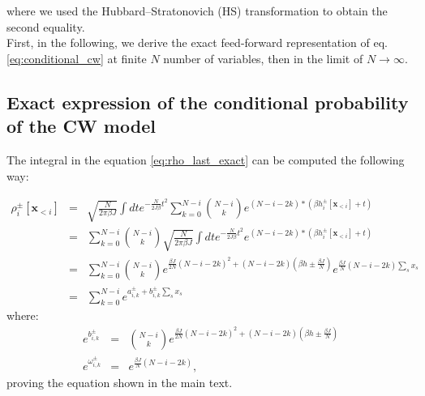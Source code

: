 \documentclass[10pt, notitlepage]{revtex4-2}
\begin{document}
 where we used the Hubbard–Stratonovich (HS) transformation to obtain the second equality.\\
 First, in the following, we derive the exact feed-forward representation of eq.\ref{eq:conditional_cw} at finite $N$ number of variables, then in the limit of $N\rightarrow \infty$.\\

 \subsection{Exact expression of the conditional probability of the CW model}
 The integral in the equation \ref{eq:rho_last_exact} can be computed the following way:

 \begin{eqnarray*}
 \rho_i^{\pm}[\mathbf{x}_{<i}] &=& \sqrt{\frac{N}{2\pi \beta J}}\int dt e^{-\frac{N}{2J \beta}t^{2}} 
 \sum_{k=0}^{N-i} \binom{N-i}{k} e^{(N-i-2k)*(\beta h_i^{\pm}[\mathbf{x}_{<i}] + t)}\\
 &=& \sum_{k=0}^{N-i} \binom{N-i}{k} \sqrt{\frac{N}{2\pi \beta J}}\int dt e^{-\frac{N}{2J \beta}t^{2}} 
  e^{(N-i-2k)*(\beta h_i^{\pm}[\mathbf{x}_{<i}] + t)}\\
&=& \sum_{k=0}^{N-i} \binom{N-i}{k}e^{\frac{\beta J}{2N}\left(N-i-2k\right)^{2}+\left(N-i-2k\right)\left(\beta h \pm \frac{\beta J}{N}\right)} e^{\frac{\beta J}{N}\left(N-i-2k\right) \sum_s x_s} \\
&=& \sum_{k=0}^{N-i} e^{a_{i,k}^{\pm} + b_{i,k}^{\pm} \sum_s x_s} 
\end{eqnarray*}
where:
\begin{eqnarray}
\label{eq:params}
e^{b_{i,k}^{\pm}} & = & \binom{N-i}{k}e^{\frac{\beta J}{2N}\left(N-i-2k\right)^{2}+\left(N-i-2k\right)\left(\beta h \pm \frac{\beta J}{N}\right)}\\
e^{\omega_{i,k}^{\pm}} & = & e^{\frac{\beta J}{N}\left(N-i-2k\right)},
\end{eqnarray}
proving the equation shown in the main text.
\end{document}
